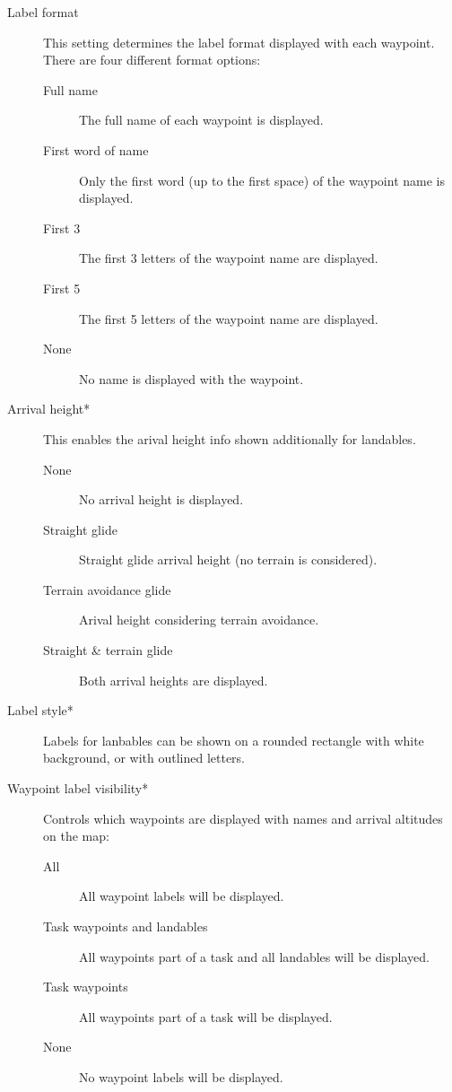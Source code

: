 \begin{description}
\item[Label format]  This setting \label{conf:labels} determines the label format 
 displayed with each waypoint. There are four different format options:
\begin{description}
 \item[Full name]  The full name of each waypoint is displayed.
 \item[First word of name]  Only the first word (up to the first space) of the waypoint name is displayed.
 \item[First 3]  The first 3 letters of the waypoint name are displayed.
 \item[First 5]  The first 5 letters of the waypoint name are displayed.
 \item[None]  No name is displayed with the waypoint.
\end{description}

\item[Arrival height*]  This enables the arival height info shown additionally for landables.
\begin{description}
 \item[None]  No arrival height is displayed.
 \item[Straight glide]  Straight glide arrival height (no terrain is considered).
 \item[Terrain avoidance glide]  Arival height considering terrain avoidance.
 \item[Straight \& terrain glide]  Both arrival heights are displayed.
\end{description}

\item[Label style*]  Labels for lanbables can be shown on a rounded rectangle with white background, or 
 with outlined letters.

\item[Waypoint label visibility*] \label{conf:labelvisibility} Controls which waypoints 
 are displayed with names and arrival altitudes on the map:
\begin{description}
 \item[All]  All waypoint labels will be displayed.
 \item[Task waypoints and landables]  All waypoints part of a task and all landables will be displayed.
 \item[Task waypoints]  All waypoints part of a task will be displayed.
 \item[None]  No waypoint labels will be displayed.
\end{description}


\end{description}
